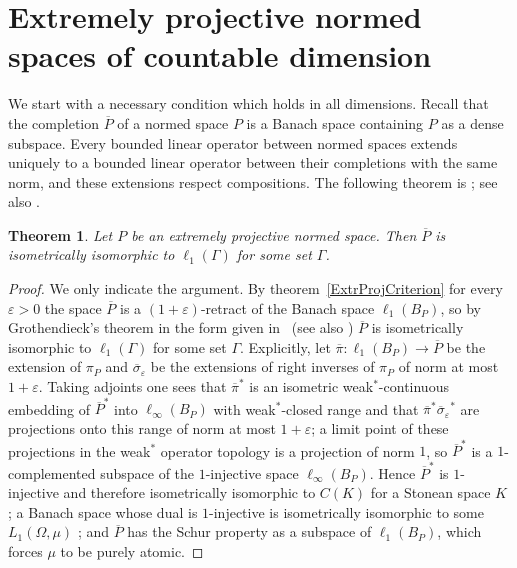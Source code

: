 \documentclass[12pt]{article}
\newtheorem{theorem}{Theorem}[section]
\newcommand{\ellone}[1]{\ell_1(#1)}
\begin{document}

\section{Extremely projective normed spaces of countable
  dimension}\label{SectionMainTheorem}

We start with a necessary condition which holds in all dimensions. Recall that
the completion $\overline{P}$ of a normed space $P$ is a Banach space containing
$P$ as a dense subspace. Every bounded linear operator between normed spaces
extends uniquely to a bounded linear operator between their completions with
the same norm, and these extensions respect compositions. The following
theorem is \cite[proposition 2.3]{HelExtrProjSeqAlg}; see also
\cite[section 3]{GronLiftProbNormSp}.

\begin{theorem}\label{CompletionIsEllOne} Let $P$ be an extremely projective
    normed space. Then $\overline{P}$ is isometrically isomorphic to
    $\ellone{\Gamma}$ for some set $\Gamma$.
\end{theorem}
\begin{proof} We only indicate the argument. By theorem~\ref{ExtrProjCriterion}
    for every $\varepsilon>0$ the space $\overline{P}$ is a
    $(1+\varepsilon)$-retract of the Banach space $\ellone{B_P}$, so by
    Grothendieck's theorem \cite{GrothMetrProjFlatBanSp} in the form given
    in~\cite[section 2]{HelExtrProjSeqAlg} (see also \cite[proposition 3.2]{HelMetrFrQMod})
    $\overline{P}$ is isometrically isomorphic to $\ellone{\Gamma}$ for some
    set $\Gamma$. Explicitly, let $\overline{\pi}:\ellone{B_P}\to\overline{P}$
    be the extension of $\pi_P$ and $\overline{\sigma}_\varepsilon$ be the
    extensions of right inverses of $\pi_P$ of norm at most $1+\varepsilon$.
    Taking adjoints one sees that ${\overline{\pi}}^*$ is an isometric
    weak$^*$-continuous embedding of ${\overline{P}}^*$ into
    $\ell_\infty(B_P)$ with weak$^*$-closed range and that
    ${\overline{\pi}}^*{\overline{\sigma}_\varepsilon}^*$ are projections onto
    this range of norm at most $1+\varepsilon$; a limit point of these
    projections in the weak$^*$ operator topology is a projection of norm
    $1$, so ${\overline{P}}^*$ is a $1$-complemented subspace of the
    $1$-injective space $\ell_\infty(B_P)$. Hence ${\overline{P}}^*$ is
    $1$-injective and therefore isometrically isomorphic to $C(K)$ for a Stonean
    space $K$ \cite[chapter 3, \S 11, theorem 6]{LaceyIsomThOfClassicBanSp}; a Banach space
    whose dual is $1$-injective is isometrically isomorphic to some
    $L_1(\Omega,\mu)$ \cite[chapter 7]{LaceyIsomThOfClassicBanSp}; and
    $\overline{P}$ has the Schur property as a subspace of
    $\ellone{B_P}$, which forces $\mu$ to be purely atomic.
\end{proof}
\end{document}
